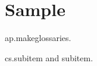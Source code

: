 \documentclass{article}
\begin{document}
\printunsrtglossaries

\section{Sample}

\gls{ap.makeglossaries}.

\gls{cs.subitem} and \gls{subitem}.

\end{document}
